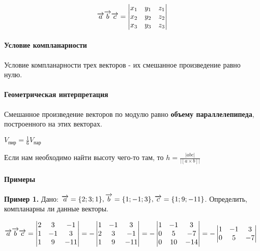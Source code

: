 \documentclass{article}
\def\vec{\ensuremath\overrightarrow}
\begin{document}
\begin{flushleft}
$$\vec{a} \vec{b} \vec{c} = \begin{vmatrix}
    x_1 & y_1 & z_1 \\
    x_2 & y_2 & z_2 \\
    x_3 & y_3 & z_3
\end{vmatrix}$$

\paragraph{Условие компланарности} Условие компланарности трех векторов - их смешанное произведение равно нулю.

\paragraph{Геометрическая интерпретация} Смешанное произведение векторов по модулю равно \textbf{объему параллелепипеда}, построенного на этих векторах.

$V_{\text{пир}} = \frac{1}{6} V_{\text{пар}}$

Если нам необходимо найти высоту чего-то там, то $h = \frac{|a b c|}{|[a \times b]|}$

\paragraph{Примеры}

\hfill

\textbf{Пример 1.} Дано: $\vec{a} = \{ 2; 3; 1 \}, \vec{b} = \{ 1; -1; 3 \}, \vec{c} = \{ 1; 9; -11 \}$. Определить, компланарны ли данные векторы.

$\vec{a} \vec{b} \vec{c} = \begin{vmatrix}
    2 & 3 & -1 \\
    1 & -1 & 3 \\
    1 & 9 & -11
\end{vmatrix} = -\begin{vmatrix}
    1 & -1 & 3 \\
    2 & 3 & -1 \\
    1 & 9 & -11
\end{vmatrix} = -\begin{vmatrix}
    1 & -1 & 3 \\
    0 & 5 & -7 \\
    0 & 10 & -14
\end{vmatrix} = -\begin{vmatrix}
    1 & -1 & 3 \\
    0 & 5 & -7
\end{vmatrix}$


\end{flushleft}
\end{document}
